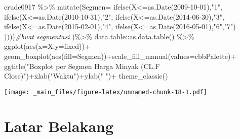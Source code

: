 \documentclass[
]{book}
\newenvironment{Shaded}{\begin{snugshade}}{\end{snugshade}}
\newcommand{\AttributeTok}[1]{\textcolor[rgb]{0.77,0.63,0.00}{#1}}
\newcommand{\CommentTok}[1]{\textcolor[rgb]{0.56,0.35,0.01}{\textit{#1}}}
\newcommand{\FunctionTok}[1]{\textcolor[rgb]{0.00,0.00,0.00}{#1}}
\newcommand{\NormalTok}[1]{#1}
\newcommand{\SpecialCharTok}[1]{\textcolor[rgb]{0.00,0.00,0.00}{#1}}
\newcommand{\StringTok}[1]{\textcolor[rgb]{0.31,0.60,0.02}{#1}}
\begin{document}
\begin{Shaded}
\begin{Highlighting}[]
\NormalTok{crude0917 }\SpecialCharTok{\%\textgreater{}\%}
  \FunctionTok{mutate}\NormalTok{(}\AttributeTok{Segmen=}
          \FunctionTok{ifelse}\NormalTok{(X}\SpecialCharTok{\textless{}=}\FunctionTok{as.Date}\NormalTok{(}\StringTok{\textquotesingle{}2009{-}10{-}01\textquotesingle{}}\NormalTok{),}\StringTok{"1"}\NormalTok{,}
          \FunctionTok{ifelse}\NormalTok{(X}\SpecialCharTok{\textless{}=}\FunctionTok{as.Date}\NormalTok{(}\StringTok{\textquotesingle{}2010{-}10{-}31\textquotesingle{}}\NormalTok{),}\StringTok{"2"}\NormalTok{,}
          \FunctionTok{ifelse}\NormalTok{(X}\SpecialCharTok{\textless{}=}\FunctionTok{as.Date}\NormalTok{(}\StringTok{\textquotesingle{}2014{-}06{-}30\textquotesingle{}}\NormalTok{),}\StringTok{"3"}\NormalTok{,}
          \FunctionTok{ifelse}\NormalTok{(X}\SpecialCharTok{\textless{}=}\FunctionTok{as.Date}\NormalTok{(}\StringTok{\textquotesingle{}2015{-}02{-}01\textquotesingle{}}\NormalTok{),}\StringTok{"4"}\NormalTok{,}
          \FunctionTok{ifelse}\NormalTok{(X}\SpecialCharTok{\textless{}=}\FunctionTok{as.Date}\NormalTok{(}\StringTok{\textquotesingle{}2016{-}05{-}01\textquotesingle{}}\NormalTok{),}\StringTok{"6"}\NormalTok{,}\StringTok{"7"}\NormalTok{)}
\NormalTok{          ))))}\CommentTok{\#buat segmentasi }
\NormalTok{  )}\SpecialCharTok{\%\textgreater{}\%}\NormalTok{ data.table}\SpecialCharTok{::}\FunctionTok{as.data.table}\NormalTok{() }\SpecialCharTok{\%\textgreater{}\%}
  \FunctionTok{ggplot}\NormalTok{(}\FunctionTok{aes}\NormalTok{(}\AttributeTok{x=}\NormalTok{X,}\AttributeTok{y=}\NormalTok{fixed))}\SpecialCharTok{+}
  \FunctionTok{geom\_boxplot}\NormalTok{(}\FunctionTok{aes}\NormalTok{(}\AttributeTok{fill=}\NormalTok{Segmen))}\SpecialCharTok{+}\FunctionTok{scale\_fill\_manual}\NormalTok{(}\AttributeTok{values=}\NormalTok{cbbPalette)}\SpecialCharTok{+}
  \FunctionTok{ggtitle}\NormalTok{(}\StringTok{"Boxplot per Segmen Harga Minyak (CL.F Close)"}\NormalTok{)}\SpecialCharTok{+}\FunctionTok{xlab}\NormalTok{(}\StringTok{"Waktu"}\NormalTok{)}\SpecialCharTok{+}\FunctionTok{ylab}\NormalTok{(}\StringTok{" "}\NormalTok{)}\SpecialCharTok{+}
  \FunctionTok{theme\_classic}\NormalTok{()}
\end{Highlighting}
\end{Shaded}

\texttt{[image: \_main\_files/figure-latex/unnamed-chunk-18-1.pdf]}

\hypertarget{latar-belakang}{%
\section{Latar Belakang}\label{latar-belakang}}
\end{document}
